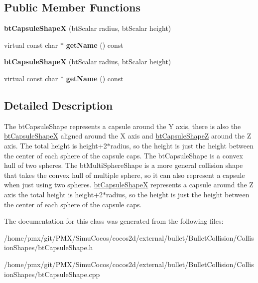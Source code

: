 \subsection*{Public Member Functions}
\begin{DoxyCompactItemize}
\item 
\mbox{\label{classbtCapsuleShapeX_ad9933edc948f83013b31607456f61db6}} 
{\bfseries bt\+Capsule\+ShapeX} (bt\+Scalar radius, bt\+Scalar height)
\item 
\mbox{\label{classbtCapsuleShapeX_acd382d9e9d13970363e41261bc108519}} 
virtual const char $\ast$ {\bfseries get\+Name} () const
\item 
\mbox{\label{classbtCapsuleShapeX_ad9933edc948f83013b31607456f61db6}} 
{\bfseries bt\+Capsule\+ShapeX} (bt\+Scalar radius, bt\+Scalar height)
\item 
\mbox{\label{classbtCapsuleShapeX_acd382d9e9d13970363e41261bc108519}} 
virtual const char $\ast$ {\bfseries get\+Name} () const
\end{DoxyCompactItemize}


\subsection{Detailed Description}
The bt\+Capsule\+Shape represents a capsule around the Y axis, there is also the \hyperlink{classbtCapsuleShapeX}{bt\+Capsule\+ShapeX} aligned around the X axis and \hyperlink{classbtCapsuleShapeZ}{bt\+Capsule\+ShapeZ} around the Z axis. The total height is height+2$\ast$radius, so the height is just the height between the center of each \textquotesingle{}sphere\textquotesingle{} of the capsule caps. The bt\+Capsule\+Shape is a convex hull of two spheres. The bt\+Multi\+Sphere\+Shape is a more general collision shape that takes the convex hull of multiple sphere, so it can also represent a capsule when just using two spheres. \hyperlink{classbtCapsuleShapeX}{bt\+Capsule\+ShapeX} represents a capsule around the Z axis the total height is height+2$\ast$radius, so the height is just the height between the center of each \textquotesingle{}sphere\textquotesingle{} of the capsule caps. 

The documentation for this class was generated from the following files\+:\begin{DoxyCompactItemize}
\item 
/home/pmx/git/\+P\+M\+X/\+Simu\+Cocos/cocos2d/external/bullet/\+Bullet\+Collision/\+Collision\+Shapes/bt\+Capsule\+Shape.\+h\item 
/home/pmx/git/\+P\+M\+X/\+Simu\+Cocos/cocos2d/external/bullet/\+Bullet\+Collision/\+Collision\+Shapes/bt\+Capsule\+Shape.\+cpp\end{DoxyCompactItemize}
